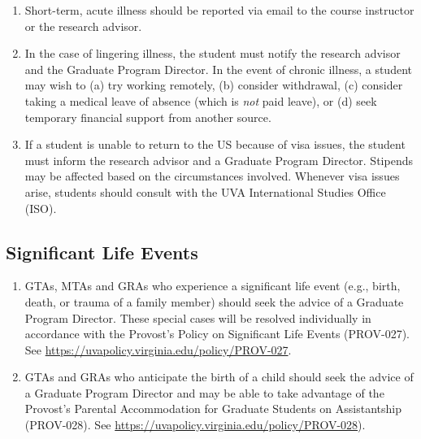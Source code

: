 \begin{enumerate}
\def\labelenumi{\arabic{enumi}.}
\item
  Short-term, acute illness should be reported via email to the course
  instructor or the research advisor.
\item
  In the case of lingering illness, the student must notify the research
  advisor and the Graduate Program Director. In the event of chronic
  illness, a student may wish to (a) try working remotely, (b) consider
  withdrawal, (c) consider taking a medical leave of absence (which is
  \emph{not} paid leave), or (d) seek temporary financial support from
  another source.
\item
  If a student is unable to return to the US because of visa issues, the
  student must inform the research advisor and a Graduate Program
  Director. Stipends may be affected based on the circumstances involved. Whenever visa issues arise, students should consult with the UVA International Studies Office (ISO).
\end{enumerate}

\hypertarget{significant-life-events}{%
\subsection{Significant Life Events}\label{significant-life-events}}

\begin{enumerate}
\def\labelenumi{\arabic{enumi}.}
\item
  GTAs, MTAs and GRAs who experience a significant life event (e.g.,
  birth, death, or trauma of a family member) should seek the advice of
  a Graduate Program Director. These special cases will be resolved
  individually in accordance with the Provost's Policy on Significant
  Life Events (PROV-027). See
  \href{https://uvapolicy.virginia.edu/policy/PROV-027}{{https://uvapolicy.virginia.edu/policy/PROV-027}}.
\item
  GTAs and GRAs who anticipate the birth of a child should seek the
  advice of a Graduate Program Director and may be able to take
  advantage of the Provost's Parental Accommodation for Graduate
  Students on Assistantship (PROV-028). See
  \href{https://uvapolicy.virginia.edu/policy/PROV-028}{{https://uvapolicy.virginia.edu/policy/PROV-028}}).
\end{enumerate}




